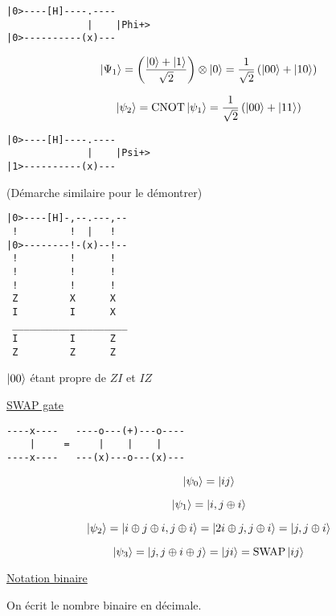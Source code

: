 \begin{verbatim}
|0>----[H]----.----
              |    |Phi+>
|0>----------(x)---
\end{verbatim}

$$\ket{\Psi_{1}} = \left( \frac{\ket{0}+\ket{1}}{\sqrt{2}}  \right) \otimes \ket{0} = \frac{1}{\sqrt{2}} \left( \ket{00} + \ket{10} \right)  $$ 

$$\ket{\psi_{2}} =\text{CNOT} \ket{\psi_1} = \frac{1}{\sqrt{2}} \left( \ket{00}+\ket{11} \right) $$ 


\begin{verbatim}
|0>----[H]----.----
              |    |Psi+>
|1>----------(x)---
\end{verbatim}
(Démarche similaire pour le démontrer)


\begin{verbatim}
|0>----[H]-,--.---,--
 !         !  |   !
|0>--------!-(x)--!--
 !         !      !
 !         !      !
 !         !      !
 Z         X      X
 I         I      X
 ____________________
 I         I      Z
 Z         Z      Z
\end{verbatim}

$\ket{00}$ étant propre de $ZI$ et $IZ$   

\underline{SWAP gate} 

\begin{verbatim}
----x----   ----o---(+)---o----
    |     =     |    |    |    
----x----   ---(x)---o---(x)---
\end{verbatim}


$$\ket{\psi_{0}} = \ket{ij}$$ 

$$\ket{\psi_{1}} = \ket{i, j \oplus i}$$ 

$$\ket{\psi_2} =\ket{i \oplus j \oplus i, j \oplus i} = \ket{2 i \oplus j, j \oplus i} = \ket{j, j \oplus i}$$ 

$$\ket{\psi_{3}} = \ket{j, j \oplus i \oplus j} = \ket{ji} = \text{SWAP} \ket{ij}$$ 


\underline{Notation binaire} 

On écrit le nombre binaire en décimale.



